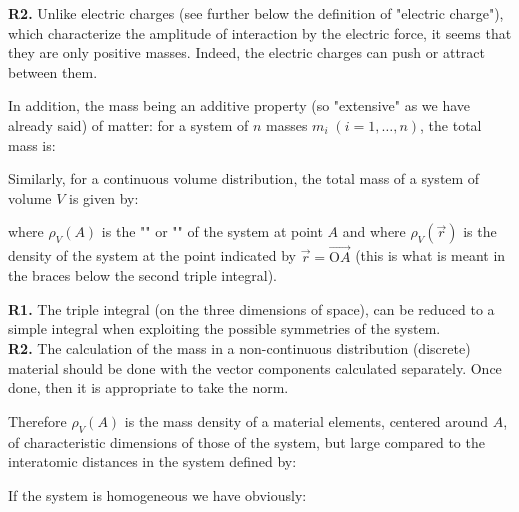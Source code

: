 \begin{enumerate}
\begin{tcolorbox}[title=Remarks,colframe=black,arc=10pt]
		\textbf{R2.} Unlike electric charges (see further below the definition of "electric charge"), which characterize the amplitude of interaction by the electric force, it seems that they are only positive masses. Indeed, the electric charges can push or attract between them.
		\end{tcolorbox}
	\end{enumerate}
	In addition, the mass being an additive property (so "extensive" as we have already said) of matter: for a system of $n$ masses $m_i\;(i=1,\ldots,n)$, the total mass is:
	
	Similarly, for a continuous volume distribution, the total mass of a system of volume $V$ is given by:
	
	where $\rho_V(A)$ is the "" or "" of the system at point $A$ and where $\rho_V(\vec{r})$ is the density of the system at the point indicated by $\vec{r}=\overrightarrow{\text{O}A}$ (this is what is meant in the braces below the second triple integral).
	\begin{tcolorbox}[title=Remarks,colframe=black,arc=10pt]
	\textbf{R1.} The triple integral (on the three dimensions of space), can be reduced to a simple integral when exploiting the possible symmetries of the system.\\
	
	\textbf{R2.} The calculation of the mass in a non-continuous distribution (discrete) material should be done with the vector components calculated separately. Once done, then it is appropriate to take the norm.\\
	\end{tcolorbox}
	
	Therefore $\rho_V(A)$ is the mass density of a material elements, centered around $A$, of characteristic dimensions of those of the system, but large compared to the interatomic distances in the system defined by:
	
	If the system is homogeneous we have obviously:
	
